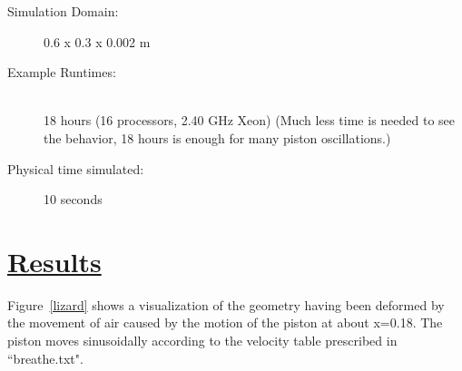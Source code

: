 \begin{description}
\item [Simulation Domain:]\hfill    0.6 x 0.3 x 0.002 m

\item [Example Runtimes:] \hfill \\
 18 hours   (16 processors, 2.40 GHz Xeon) (Much less time is needed to
see the behavior, 18 hours is enough for many piston oscillations.)\\

\item [Physical time simulated:] \hfill 10 seconds \\ 


\end{description}

\section*{\underline{Results}}


\begin{figure}
  \centering
  \vspace{-40pt}
  \hspace{10pt}
  \caption{}
  \label{}

\end{figure}

Figure~\ref{lizard} shows a visualization of the geometry having been deformed by the movement of air caused by the motion of the piston at about x=0.18.  The 
piston moves sinusoidally according to the velocity table prescribed in ``breathe.txt".




